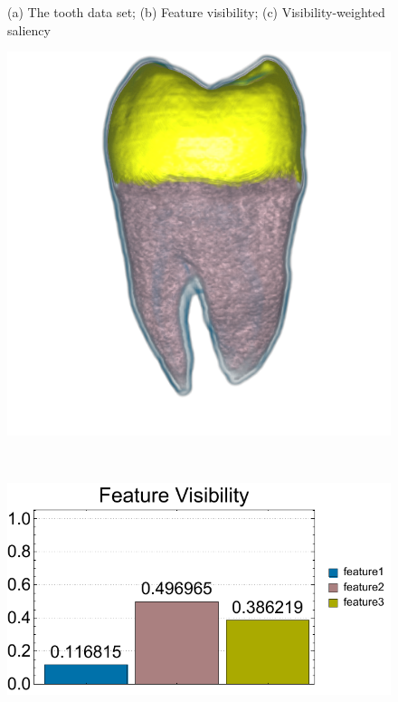 \begin{figure}
\begin{minipage}{.24\textwidth}
		\subcaption{}
	\end{minipage}
	\caption{(a) The tooth data set; (b) Feature visibility; (c) Visibility-weighted saliency}
	\label{fig:tooth_naive_optimized_linesearch}
\end{figure}

\begin{figure}
	\centering
	\begin{minipage}{.24\textwidth}
		\includegraphics[width=1\linewidth]{images/tooth_naive_optimized_linesearch_red_low_saturation}
		\subcaption{}
	\end{minipage}~
	\begin{minipage}{.24\textwidth}
		\includegraphics[width=1\linewidth]{figures/tooth_naive_optimized_linesearch_red_low_saturation_visibility_chart}

\end{minipage}
\end{figure}
